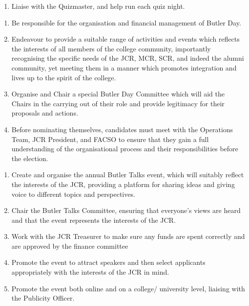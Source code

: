 \begin{enumerate}
    \item Liaise with the Quizmaster, and help run each quiz night.
    
\end{enumerate}

\begin{enumerate}
    \item Be responsible for the organisation and financial management of Butler Day.
    \item Endeavour to provide a suitable range of activities and events which reflects the interests of all members of the college community, importantly recognising the specific needs of the JCR, MCR, SCR, and indeed the alumni community, yet meeting them in a manner which promotes integration and lives up to the spirit of the college.
    \item Organise and Chair a special Butler Day Committee which will aid the Chairs in the carrying out of their role and provide legitimacy for their proposals and actions.
    \item Before nominating themselves, candidates must meet with the Operations Team, JCR President, and FACSO to ensure that they gain a full understanding of the organisational process and their responsibilities before the election.
    
\end{enumerate}

\begin{enumerate}
    \item Create and organise the annual Butler Talks event, which will suitably reflect the interests of the JCR, providing a platform for sharing ideas and giving voice to different topics and perspectives.
    \item Chair the Butler Talks Committee, ensuring that everyone’s views are heard and that the event represents the interests of the JCR.
    \item Work with the JCR Treasurer to make sure any funds are spent correctly and are approved by the finance committee   \item Promote the event to attract speakers and then select applicants appropriately with the interests of the JCR in mind.
    \item Promote the event both online and on a college/ university level, liaising with the Publicity Officer.
    
\end{enumerate}

